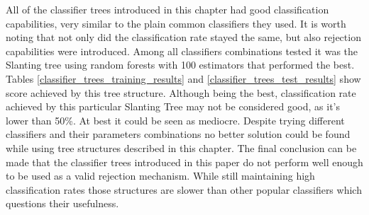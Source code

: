 All of the classifier trees introduced in this chapter had good classification capabilities, very similar to the plain common classifiers they used. It is worth noting that not only did the classification rate stayed the same, but also rejection capabilities were introduced. Among all classifiers combinations tested it was the Slanting tree using random forests with 100 estimators that performed the best. Tables \ref{classifier_trees_training_results} and \ref{classifier_trees_test_results} show score achieved by this tree structure. Although being the best, classification rate achieved by this particular Slanting Tree may not be considered good, as it's lower than 50\%. At best it could be seen as mediocre. Despite trying different classifiers and their parameters combinations no better solution could be found while using tree structures described in this chapter. The final conclusion can be made that the classifier trees introduced in this paper do not perform well enough to be used as a valid rejection mechanism. While still maintaining high classification rates those structures are slower than other popular classifiers which questions their usefulness.